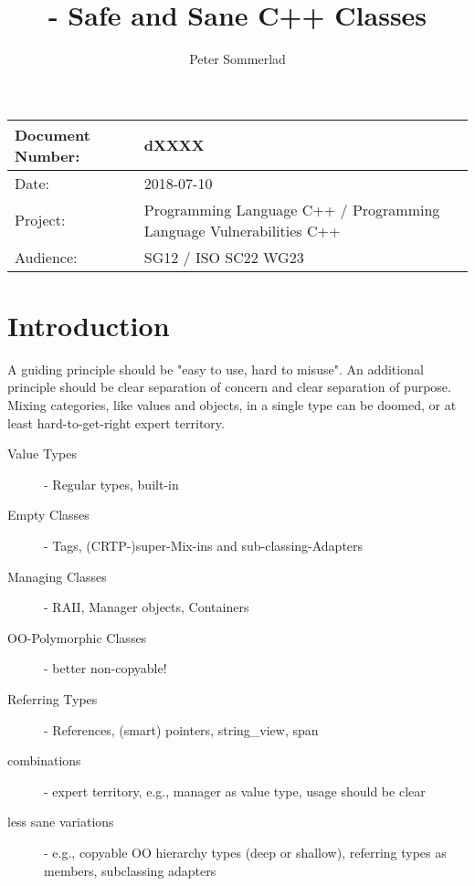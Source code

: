 \documentclass[ebook,11pt,article]{memoir}
\title{\papernumber{} - Safe and Sane C++ Classes}
\author{Peter Sommerlad}
\date{\paperdate}                %
\newcommand{\papernumber}{dXXXX}
\newcommand{\paperdate}{2018-07-10}
\begin{document}
\maketitle
\begin{center}
\begin{tabular}[t]{|l|l|}\hline 
Document Number:&  \papernumber \\\hline
Date: & \paperdate \\\hline
Project: & Programming Language C++ / Programming Language Vulnerabilities C++\\\hline 
Audience: & SG12 / ISO SC22 WG23\\\hline
\end{tabular}
\end{center}
\chapter{Introduction}
A guiding principle should be "easy to use, hard to misuse". An additional principle should be clear separation of concern and clear separation of purpose. Mixing categories, like values and objects, in a single type can be doomed, or at least hard-to-get-right expert territory.
\begin{description}
\item [Value Types] - Regular types, built-in
\item [Empty Classes] - Tags, (CRTP-)super-Mix-ins and sub-classing-Adapters
\item [Managing Classes] - RAII, Manager objects, Containers
\item [OO-Polymorphic Classes] - better non-copyable!
\item [Referring Types] - References, (smart) pointers, string_view, span
\item [combinations] - expert territory, e.g., manager as value type, usage should be clear
\item [less sane variations] - e.g., copyable OO hierarchy types (deep or shallow), referring types as members, subclassing adapters 
\end{description}
\end{document}
